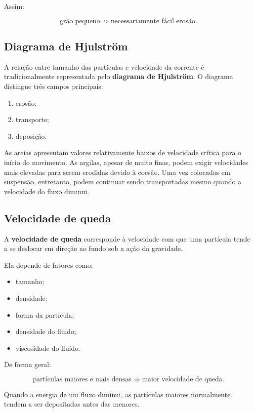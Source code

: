 \documentclass[a4paper,12pt]{article}
\theoremstyle{definition}
\theoremstyle{definition}
\theoremstyle{definition}
\begin{document}
Assim:

\[
\text{grão pequeno}
\not\Rightarrow
\text{necessariamente fácil erosão}.
\]

\subsection{Diagrama de Hjulström}

A relação entre tamanho das partículas e velocidade da corrente é
tradicionalmente representada pelo \textbf{diagrama de Hjulström}. O diagrama
distingue três campos principais:

\begin{enumerate}
    \item erosão;
    \item transporte;
    \item deposição.
\end{enumerate}

As areias apresentam valores relativamente baixos de velocidade crítica para o
início do movimento. As argilas, apesar de muito finas, podem exigir velocidades
mais elevadas para serem erodidas devido à coesão. Uma vez colocadas em
suspensão, entretanto, podem continuar sendo transportadas mesmo quando a
velocidade do fluxo diminui.

\subsection{Velocidade de queda}

A \textbf{velocidade de queda} corresponde à velocidade com que uma partícula
tende a se deslocar em direção ao fundo sob a ação da gravidade.

Ela depende de fatores como:

\begin{itemize}
    \item tamanho;
    \item densidade;
    \item forma da partícula;
    \item densidade do fluido;
    \item viscosidade do fluido.
\end{itemize}

De forma geral:

\[
\text{partículas maiores e mais densas}
\Rightarrow
\text{maior velocidade de queda}.
\]

Quando a energia de um fluxo diminui, as partículas maiores normalmente tendem
a ser depositadas antes das menores.
\end{document}

